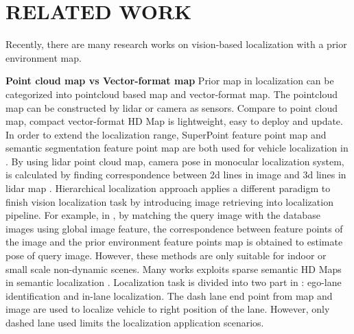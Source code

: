 \documentclass[letterpaper, 10 pt, conference]{ieeeconf}
\begin{document}



\section{RELATED WORK}

Recently, there are many research works on vision-based localization with a prior environment map. 

\textbf{Point cloud map vs Vector-format map}
Prior map in localization can be categorized into pointcloud based map and vector-format map. The pointcloud map can be constructed by lidar or camera as sensors. Compare to point cloud map, compact vector-format HD Map is lightweight, easy to deploy and update. In order to extend the localization range, SuperPoint feature point map and semantic segmentation feature point map are both used for vehicle localization in \cite{livision}. By using lidar point cloud map, camera pose in monocular localization system, is calculated by finding correspondence between 2d lines in image and 3d lines in lidar map \cite{yu2020Monocular}. Hierarchical localization approach applies a different paradigm to finish vision localization task by introducing image retrieving into localization pipeline. For example, in \cite{sarlin2019coarse}, by matching the query image with the database images using global image feature, the correspondence between feature points of the image and the prior environment feature points map is obtained to estimate pose of query image. However, these methods are only suitable for indoor or small scale non-dynamic scenes. Many works exploits sparse semantic HD Maps in semantic localization \cite{paulsmonocular, ma2019exploiting}. Localization task is divided into two part in \cite{choi2020lane}: ego-lane identification and in-lane localization. The dash lane end point from map and image are used to localize vehicle to right position of the lane. However, only dashed lane used limits the localization application scenarios.
\end{document}
